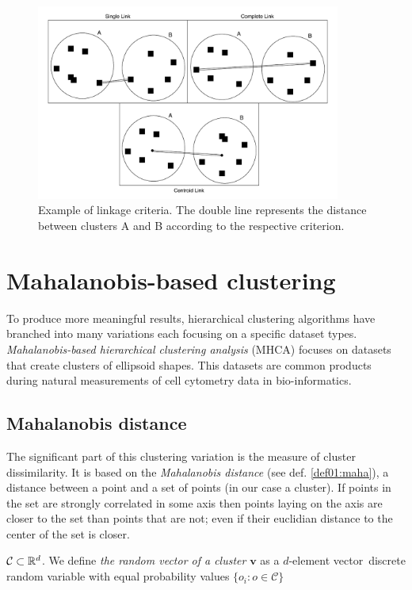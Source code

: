 \begin{figure}\centering
	\includegraphics[width=10cm]{img/linkage_criteria}
	\caption{Example of linkage criteria. The double line represents the distance between clusters A and B according to the respective criterion.}
	\label{fig01:link}
\end{figure}

\section{Mahalanobis-based clustering}

To produce more meaningful results, hierarchical clustering algorithms have branched into many variations each focusing on a specific dataset types. \emph{Ma\-ha\-la\-no\-bis-based hierarchical clustering analysis} (MHCA) focuses on datasets that create clusters of ellipsoid shapes. This datasets are common products during natural measurements of cell cytometry data in bio-informatics.

\subsection{Mahalanobis distance}

The significant part of this clustering variation is the measure of cluster dissimilarity. It is based on the \emph{Mahalanobis distance} \cite{mahalanobis1936generalized} (see def. \ref{def01:maha}), a distance between a point and a set of points (in our case a cluster). If points in the set are strongly correlated in some axis then points laying on the axis are closer to the set than points that are not; even if their euclidian distance to the center of the set is closer.

\begin{defn}[\xxx{???}]
	 $\mathcal{C} \subset \mathbb{R}^d$. We define \emph{the random vector of a cluster} $\mathbf{v}$ as a $d$-element vector\ discrete random variable with equal probability values $\{o_i:o\in \mathcal{C}\}$
\end{defn}

